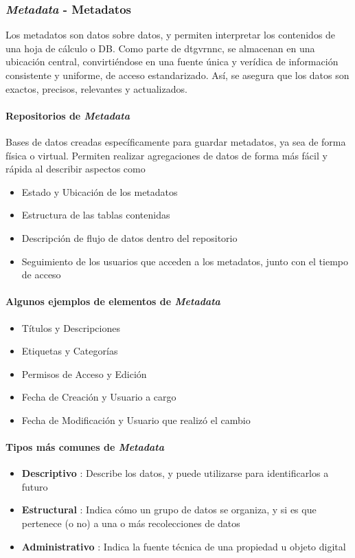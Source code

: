 \subsubsection{\textit{Metadata} - Metadatos}
Los metadatos son datos sobre datos, y permiten interpretar los contenidos de una hoja de cálculo o DB. Como parte de \gls{dtgvrnnc}, se almacenan en una ubicación central, convirtiéndose en una fuente única y verídica de información consistente y uniforme, de acceso estandarizado. Así, se asegura que los datos son exactos, precisos, relevantes y actualizados. 

\paragraph{Repositorios de \textit{Metadata}}
Bases de datos creadas específicamente para guardar metadatos, ya sea de forma física o virtual. Permiten realizar agregaciones de datos de forma más fácil y rápida al describir aspectos como
\begin{itemize}
    \item {Estado y Ubicación de los metadatos}
    \item {Estructura de las tablas contenidas}
    \item {Descripción de flujo de datos dentro del repositorio}
    \item {Seguimiento de los usuarios que acceden a los metadatos, junto con el tiempo de acceso}
\end{itemize}


\paragraph{Algunos ejemplos de elementos de \textit{Metadata}}
\begin{itemize}
    \item {Títulos y Descripciones}
    \item {Etiquetas y Categorías}
    \item {Permisos de Acceso y Edición}
    \item {Fecha de Creación y Usuario a cargo}
    \item {Fecha de Modificación y Usuario que realizó el cambio}
\end{itemize}

\paragraph{Tipos más comunes de \textit{Metadata}}
\begin{itemize}
        \item {\textbf{Descriptivo} : Describe los datos, y puede utilizarse para identificarlos a futuro}
        \item {\textbf{Estructural} : Indica cómo un grupo de datos se organiza, y si es que pertenece (o no) a una o más recolecciones de datos}
        \item {\textbf{Administrativo} : Indica la fuente técnica de una propiedad u objeto digital}
\end{itemize}

